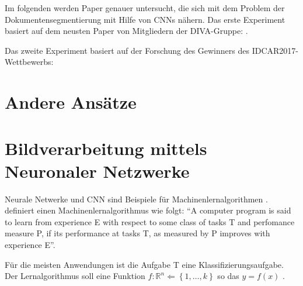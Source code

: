 Im folgenden werden Paper genauer untersucht, die sich mit dem Problem der Dokumentensegmentierung mit Hilfe von CNNs nähern.
Das erste Experiment basiert auf dem neusten Paper von Mitgliedern der DIVA-Gruppe: \citeauthor*{ChenConvolutionalNeuralNetworks2017}. 

Das zweite Experiment basiert auf der Forschung des Gewinners des IDCAR2017-Wettbewerbs: \citeauthor*{XuPageSegmentationHistorical2017} 

\section{Andere Ansätze}
\cite{WickFullyConvolutionalNeural2017}


\section{Bildverarbeitung mittels Neuronaler Netzwerke}
Neurale Netwerke und CNN sind Beispiele für Machinenlernalgorithmen .
\cite{MitchellMachinelearning1997} definiert einen Machinenlernalgorithmus wie folgt: ``A computer program is said to learn from experience E with respect to some class of tasks T and perfomance measure P, if its performance at tasks T, as measured by P improves with experience E''.

Für die meisten Anwendungen ist die Aufgabe T eine Klassifizierungsaufgabe.
Der Lernalgorithmus soll eine Funktion \(f: \mathds{R}^n \Leftarrow \left\{1,\dots,k \right\} \) so das \(y = f\left(x\right)\) \cite[97]{GoodfellowDeeplearning2016}.


